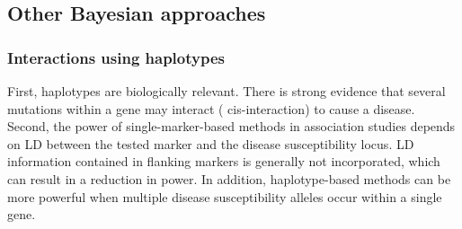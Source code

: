 \documentclass[
]{book}
\begin{document}
\hypertarget{other-bayesian-approaches}{%
\subsection{Other Bayesian approaches}\label{other-bayesian-approaches}}

\hypertarget{interactions-using-haplotypes}{%
\subsubsection{Interactions using haplotypes}\label{interactions-using-haplotypes}}

First, haplotypes are biologically relevant. There is strong evidence that several mutations within a gene may interact ( cis-interaction) to cause a disease. Second, the power of single-marker-based methods in association studies depends on LD between the tested marker and the disease susceptibility locus. LD information contained in flanking markers is generally not incorporated, which can result in a reduction in power. In addition, haplotype-based methods can be more powerful when multiple disease susceptibility alleles occur within a single gene.
\end{document}
